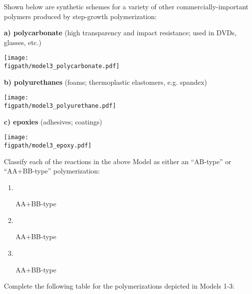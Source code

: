 \begin{activity}
\begin{model}
\label{\labelbase:model:otherstepgrowthchems}

Shown below are synthetic schemes for a variety of other commercially-important polymers produced by step-growth polymerization:

\vspace{0.1in}

\textbf{a) polycarbonate} (high transparency and impact resistance; used in DVDs, glasses, etc.)
		
			\centerline{\texttt{[image: \\figpath/model3\_polycarbonate.pdf]}}

\vspace{0.1in}

\textbf{b) polyurethanes} (foams; thermoplastic elastomers, e.g. spandex)
		
			\centerline{\texttt{[image: \\figpath/model3\_polyurethane.pdf]}}

\vspace{0.1in}

\textbf{c) epoxies} (adhesives; coatings)
		
			\centerline{\texttt{[image: \\figpath/model3\_epoxy.pdf]}}

\end{model}

\vspace{0.25in}
\begin{ctqs}

		\question Classify each of the reactions in the above Model as either an ``AB-type'' or ``AA+BB-type'' polymerization:
		
			\begin{enumerate}
				\item ~ \begin{solution}[0.6in]AA+BB-type\end{solution}
				\item ~ \begin{solution}[0.6in]AA+BB-type\end{solution}
				\item ~ \begin{solution}[0.6in]AA+BB-type\end{solution}
			\end{enumerate}
			
		
		\clearpage
		\question Complete the following table for the polymerizations depicted in Models 1-3:
		

\end{ctqs}
\end{activity}
